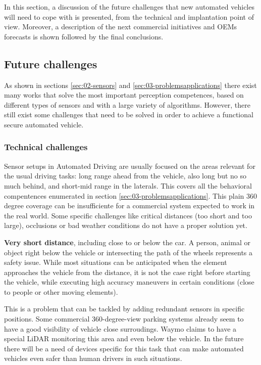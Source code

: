 
In this section, a discussion of the future challenges that new automated vehicles will need to cope with is presented, from the technical and implantation point of view. Moreover, a description of the next commercial initiatives and OEMs forecasts is shown followed by the final conclusions.



\subsection{Future challenges}

As shown in sections \ref{sec:02-sensors} and \ref{sec:03-problemsapplications} there exist many works that solve the most important perception competences, based on different types of sensors and with a large variety of algorithms. However, there still exist some challenges that need to be solved in order to achieve a functional secure automated vehicle.

\subsubsection{Technical challenges}

Sensor setups in Automated Driving are usually focused on the areas relevant 
for the usual driving tasks: long range ahead from the vehicle, also long but 
no so much behind, and short-mid range in the laterals. This covers all the 
behavioral compentences enumerated in section 
\ref{sec:03-problemsapplications}. 
This plain 360 degree coverage can be insufficiente for a commercial system
expected to work in the real world. Some specific challenges like 
critical distances (too short and too large), occlusions or bad weather 
conditions do not have a proper solution yet.

\textbf{Very short distance}, including close to or below the car.
    A person, animal or object right below the vehicle or intersecting 
    the path of the wheels represents a safety issue. While most situations
    can be anticipated when the element approaches the vehicle from the
    distance, it is not the case right before starting the vehicle, 
    while executing high accuracy maneuvers in certain conditions 
    (close to people or other moving elements).  
    
    This is a problem that can be tackled by adding redundant sensors in 
    specific positions. Some commercial 360-degree-view parking systems 
    \cite{gandhi2006vehicle} already seem to have a good visibility of vehicle 
    close 
    surroudings. Waymo claims to have a special LiDAR monitoring this area
    and even below the vehicle.         
    In the future there will be a need of devices specific for this task 
    that can make automated vehicles even safer than human drivers in such 
    situations.
      
